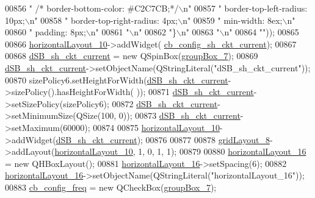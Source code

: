 \begin{DoxyCode}
00856 \textcolor{stringliteral}{"   /*  border-bottom-color: #C2C7CB;*/\(\backslash\)n"}
00857 \textcolor{stringliteral}{"     border-top-left-radius: 10px;\(\backslash\)n"}
00858 \textcolor{stringliteral}{"     border-top-right-radius: 4px;\(\backslash\)n"}
00859 \textcolor{stringliteral}{"     min-width: 8ex;\(\backslash\)n"}
00860 \textcolor{stringliteral}{"     padding: 8px;\(\backslash\)n"}
00861 \textcolor{stringliteral}{"\(\backslash\)n"}
00862 \textcolor{stringliteral}{"\}\(\backslash\)n"}
00863 \textcolor{stringliteral}{"\(\backslash\)n"}
00864 \textcolor{stringliteral}{""}));
00865 
00866         \hyperlink{a00080_af1a7bbeee705545b94c55c297299118d}{horizontalLayout\_10}->addWidget(
      \hyperlink{a00080_a541de6e510677e572ab233f7ecc25e2c}{cb\_config\_sh\_ckt\_current});
00867 
00868         \hyperlink{a00080_aab5fcfd5ceedb9c4e853139113f5c753}{dSB\_sh\_ckt\_current} = \textcolor{keyword}{new} QSpinBox(\hyperlink{a00080_a269faaef68e4ad4784635810fcae5698}{groupBox\_7});
00869         \hyperlink{a00080_aab5fcfd5ceedb9c4e853139113f5c753}{dSB\_sh\_ckt\_current}->setObjectName(QStringLiteral(\textcolor{stringliteral}{"dSB\_sh\_ckt\_current"}));
00870         sizePolicy6.setHeightForWidth(\hyperlink{a00080_aab5fcfd5ceedb9c4e853139113f5c753}{dSB\_sh\_ckt\_current}->sizePolicy().hasHeightForWidth(
      ));
00871         \hyperlink{a00080_aab5fcfd5ceedb9c4e853139113f5c753}{dSB\_sh\_ckt\_current}->setSizePolicy(sizePolicy6);
00872         \hyperlink{a00080_aab5fcfd5ceedb9c4e853139113f5c753}{dSB\_sh\_ckt\_current}->setMinimumSize(QSize(100, 0));
00873         \hyperlink{a00080_aab5fcfd5ceedb9c4e853139113f5c753}{dSB\_sh\_ckt\_current}->setMaximum(60000);
00874 
00875         \hyperlink{a00080_af1a7bbeee705545b94c55c297299118d}{horizontalLayout\_10}->addWidget(\hyperlink{a00080_aab5fcfd5ceedb9c4e853139113f5c753}{dSB\_sh\_ckt\_current});
00876 
00877 
00878         \hyperlink{a00080_a20728ed83bf740332bd908ea3e15ace6}{gridLayout\_8}->addLayout(\hyperlink{a00080_af1a7bbeee705545b94c55c297299118d}{horizontalLayout\_10}, 1, 0, 1, 1);
00879 
00880         \hyperlink{a00080_a9ab91d59aada4ff82309b36c9d5a0fa6}{horizontalLayout\_16} = \textcolor{keyword}{new} QHBoxLayout();
00881         \hyperlink{a00080_a9ab91d59aada4ff82309b36c9d5a0fa6}{horizontalLayout\_16}->setSpacing(6);
00882         \hyperlink{a00080_a9ab91d59aada4ff82309b36c9d5a0fa6}{horizontalLayout\_16}->setObjectName(QStringLiteral(\textcolor{stringliteral}{"horizontalLayout\_16"}));
00883         \hyperlink{a00080_a8f501acefacd6343a4ec99a67172f256}{cb\_config\_freq} = \textcolor{keyword}{new} QCheckBox(\hyperlink{a00080_a269faaef68e4ad4784635810fcae5698}{groupBox\_7});

\end{DoxyCode}
